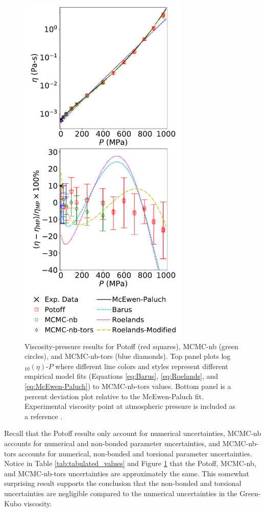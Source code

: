 \documentclass[preprint,review,12pt]{elsarticle}
\begin{document}
	\begin{figure}[htb!]
		\centering
		\includegraphics[width=3.2in]{viscosity_pressure_results.pdf}
		\caption{Viscosity-pressure results for Potoff (red squares), MCMC-nb (green circles), and MCMC-nb-tors (blue diamonds). Top panel plots log$_{10}(\eta)$-$P$ where different line colors and styles represent different empirical model fits (Equations \ref{eq:Barus}, \ref{eq:Roelands}, and \ref{eq:McEwen-Paluch}) to MCMC-nb-tors values. Bottom panel is a percent deviation plot relative to the McEwen-Paluch fit. Experimental viscosity point at atmospheric pressure is included as a reference \cite{TDE}.}
		\label{fig:viscosity_pressure}
	\end{figure}
	
	Recall that the Potoff results only account for numerical uncertainties, MCMC-nb accounts for numerical and non-bonded parameter uncertainties, and MCMC-nb-tors accounts for numerical, non-bonded and torsional parameter uncertainties. Notice in Table \ref{tab:tabulated_values} and Figure \ref{fig:viscosity_pressure} that the Potoff, MCMC-nb, and MCMC-nb-tors uncertainties are approximately the same. This somewhat surprising result supports the conclusion that the non-bonded and torsional uncertainties are negligible compared to the numerical uncertainties in the Green-Kubo viscosity. 
	
\end{document}

